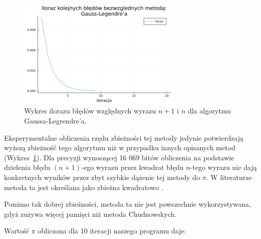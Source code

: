 \begin{figure}[!h]
    \centering
    \renewcommand{\figurename}{Wykres}
    \includegraphics[width=0.7\textwidth]{../prog/gauss_legendre_error_ratio.png}
    \caption{Wykres ilorazu błędów względnych wyrazu $n+1$ i $n$ dla algorytmu Gaussa-Legrendre'a.}
    \label{gauss-convergence}
\end{figure}

Eksperymentalne obliczenia rzędu zbieżności tej metody jedynie potwierdzają wyższą zbieżność tego algorytmu niż w przypadku innych opisanych metod (Wykres~\ref{gauss-convergence}). Dla precyzji wynoszącej 16 069 bitów obliczenia na podstawie dzielenia błędu $(n+1)$-ego wyrazu przez kwadrat błędu $n$-tego wyrazu nie dają konkretnych wyników przez zbyt szybkie dążenie tej metody do $\pi$. W literaturze metoda ta jest określana jako zbieżna kwadratowo \cite{gausse-smth}.

Pomimo tak dobrej zbieżności, metoda ta nie jest powszechnie wykorzystywana, gdyż zużywa więcej pamięci niż metoda Chudnowskych.

\newpage

Wartość $\pi$ obliczona dla 10 iteracji naszego programu daje:

